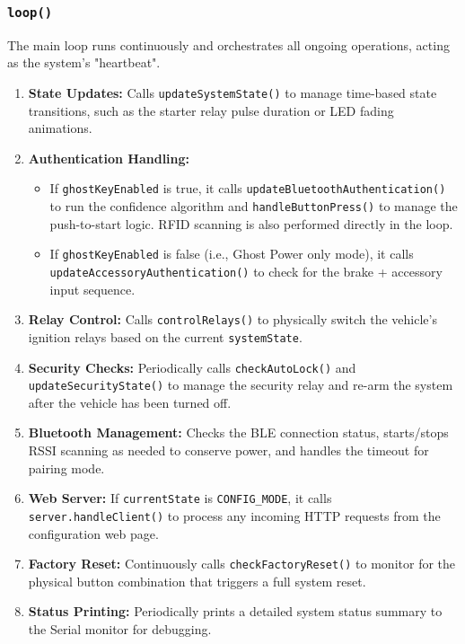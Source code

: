 \documentclass{article}
\begin{document}
\subsubsection{\texttt{loop()}}
The main loop runs continuously and orchestrates all ongoing operations, acting as the system's "heartbeat".
\begin{enumerate}
    \item \textbf{State Updates:} Calls \texttt{updateSystemState()} to manage time-based state transitions, such as the starter relay pulse duration or LED fading animations.
    \item \textbf{Authentication Handling:}
    \begin{itemize}
        \item If \texttt{ghostKeyEnabled} is true, it calls \texttt{updateBluetoothAuthentication()} to run the confidence algorithm and \texttt{handleButtonPress()} to manage the push-to-start logic. RFID scanning is also performed directly in the loop.
        \item If \texttt{ghostKeyEnabled} is false (i.e., Ghost Power only mode), it calls \texttt{updateAccessoryAuthentication()} to check for the brake + accessory input sequence.
    \end{itemize}
    \item \textbf{Relay Control:} Calls \texttt{controlRelays()} to physically switch the vehicle's ignition relays based on the current \texttt{systemState}.
    \item \textbf{Security Checks:} Periodically calls \texttt{checkAutoLock()} and \texttt{updateSecurityState()} to manage the security relay and re-arm the system after the vehicle has been turned off.
    \item \textbf{Bluetooth Management:} Checks the BLE connection status, starts/stops RSSI scanning as needed to conserve power, and handles the timeout for pairing mode.
    \item \textbf{Web Server:} If \texttt{currentState} is \texttt{CONFIG\_MODE}, it calls \texttt{server.handleClient()} to process any incoming HTTP requests from the configuration web page.
    \item \textbf{Factory Reset:} Continuously calls \texttt{checkFactoryReset()} to monitor for the physical button combination that triggers a full system reset.
    \item \textbf{Status Printing:} Periodically prints a detailed system status summary to the Serial monitor for debugging.
\end{enumerate}
\end{document}
